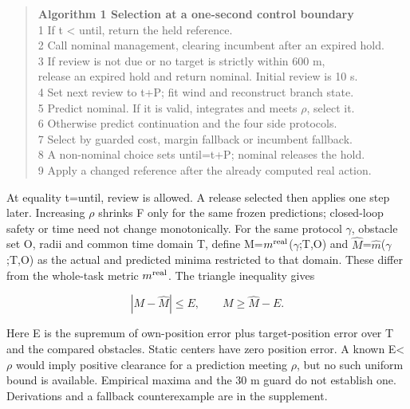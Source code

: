 \documentclass[conference]{IEEEtran}
\begin{document}
\begin{quote}\noindent\textbf{Algorithm 1  Selection at a one-second control boundary}\\[2pt]


1  If t < until, return the held reference. \\
2  Call nominal management, clearing incumbent after an expired hold. \\
3  If review is not due or no target is strictly within 600 m, \\
   release an expired hold and return nominal. Initial review is 10 s. \\
4  Set next review to t+P; fit wind and reconstruct branch state. \\
5  Predict nominal. If it is valid, integrates and meets \ensuremath{\rho}, select it. \\
6  Otherwise predict continuation and the four side protocols. \\
7  Select by guarded cost, margin fallback or incumbent fallback. \\
8  A non-nominal choice sets until=t+P; nominal releases the hold. \\
9  Apply a changed reference after the already computed real action.
\end{quote}

At equality t=until, review is allowed. A release selected then applies one step later. Increasing \ensuremath{\rho} shrinks F only for the same frozen predictions; closed-loop safety or time need not change monotonically. For the same protocol \ensuremath{\gamma}, obstacle set O, radii and common time domain T, define M=$m^{\rm real}$(\ensuremath{\gamma};T,O) and $\widehat M$=$\hat m$(\ensuremath{\gamma};T,O) as the actual and predicted minima restricted to that domain. These differ from the whole-task metric $m^{\rm real}$. The triangle inequality gives

\begin{equation}\label{eq:5}
|M-\widehat M|\le E,\qquad M\ge\widehat M-E.
\end{equation}

Here E is the supremum of own-position error plus target-position error over T and the compared obstacles. Static centers have zero position error. A known E<\ensuremath{\rho} would imply positive clearance for a prediction meeting \ensuremath{\rho}, but no such uniform bound is available. Empirical maxima and the 30 m guard do not establish one. Derivations and a fallback counterexample are in the supplement.
\end{document}

